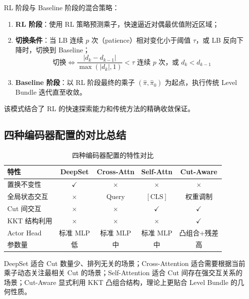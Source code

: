 \documentclass[11pt]{ctexart}
\begin{document}
RL 阶段与 Baseline 阶段的混合策略：
\begin{enumerate}[itemsep=2pt, topsep=2pt]
    \item \textbf{RL 阶段}：使用 RL 策略预测乘子，快速逼近对偶最优值附近区域；
    \item \textbf{切换条件}：当 LB 连续 $p$ 次（patience）相对变化小于阈值 $\tau$，或 LB 反向下降时，切换到 Baseline；
    \begin{equation}
    \text{切换} \iff \frac{|d_k - d_{k-1}|}{\max(|d_k|, 1)} < \tau \text{ 连续 } p \text{ 次，或 } d_k < d_{k-1}
    \end{equation}
    \item \textbf{Baseline 阶段}：以 RL 阶段最终的乘子 $(\hat{\pi}, \hat{\pi}_0)$ 为起点，执行传统 Level Bundle 迭代直至收敛。
\end{enumerate}
该模式结合了 RL 的快速探索能力和传统方法的精确收敛保证。


\subsection{四种编码器配置的对比总结}

\begin{table}[h]
\centering
\begin{tabular}{lcccc}
\hline
\textbf{特性} & \textbf{DeepSet} & \textbf{Cross-Attn} & \textbf{Self-Attn} & \textbf{Cut-Aware} \\
\hline
置换不变性 & $\checkmark$ & $\times$ & $\times$ & $\times$ \\
全局状态交互 & $\times$ & Query & $[\text{CLS}]$ & 权重调制 \\
Cut 间交互 & $\times$ & $\times$ & $\checkmark$ & $\checkmark$ \\
KKT 结构利用 & $\times$ & $\times$ & $\times$ & $\checkmark$ \\
Actor Head & 标准 MLP & 标准 MLP & 标准 MLP & 凸组合+残差 \\
参数量 & 低 & 中 & 中 & 高 \\
\hline
\end{tabular}
\caption{四种编码器配置的特性对比}
\end{table}

DeepSet 适合 Cut 数量少、排列无关的场景；Cross-Attention 适合需要根据当前乘子动态关注最相关 Cut 的场景；Self-Attention 适合 Cut 间存在强交互关系的场景；Cut-Aware 显式利用 KKT 凸组合结构，理论上更贴合 Level Bundle 的几何性质。
\end{document}
